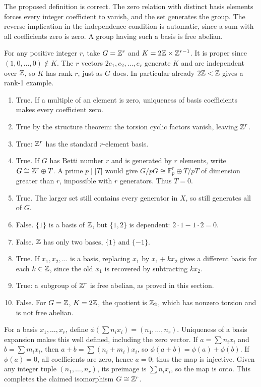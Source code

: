 The proposed definition is correct. The zero relation with distinct basis elements forces every integer coefficient to vanish, and the set generates the group. The reverse implication in the independence condition is automatic, since a sum with all coefficients zero is zero. A group having such a basis is free abelian.

For any positive integer $r$, take $G=\mathbb{Z}^r$ and $K=2\mathbb{Z}\times\mathbb{Z}^{r-1}$. It is proper since $(1,0,\ldots,0)\notin K$.
The $r$ vectors $2e_1,e_2,\ldots,e_r$ generate $K$ and are independent over $\mathbb{Z}$, so $K$ has rank $r$, just as $G$ does. In particular already $2\mathbb{Z}<\mathbb{Z}$ gives a rank-1 example.

\begin{enumerate}[label=\textbf{(\alph*)}]
\item True. If a multiple of an element is zero, uniqueness of basis coefficients makes every coefficient zero.
\item True by the structure theorem: the torsion cyclic factors vanish, leaving $\mathbb{Z}^r$.
\item True: $\mathbb{Z}^r$ has the standard $r$-element basis.
\item True. If $G$ has Betti number $r$ and is generated by $r$ elements, write $G\cong\mathbb{Z}^r\oplus T$. A prime $p\mid|T|$ would give $G/pG\cong\mathbb F_p^r\oplus T/pT$ of dimension greater than $r$, impossible with $r$ generators. Thus $T=0$.
\item True. The larger set still contains every generator in $X$, so still generates all of $G$.
\item False. $\{1\}$ is a basis of $\mathbb{Z}$, but $\{1,2\}$ is dependent: $2\cdot1-1\cdot2=0$.
\item False. $\mathbb{Z}$ has only two bases, $\{1\}$ and $\{-1\}$.
\item True. If $x_1,x_2,\ldots$ is a basis, replacing $x_1$ by $x_1+kx_2$ gives a different basis for each $k\in\mathbb{Z}$, since the old $x_1$ is recovered by subtracting $kx_2$.
\item True: a subgroup of $\mathbb{Z}^r$ is free abelian, as proved in this section.
\item False. For $G=\mathbb{Z}$, $K=2\mathbb{Z}$, the quotient is $\mathbb{Z}_2$, which has nonzero torsion and is not free abelian.
\end{enumerate}

For a basis $x_1,\ldots,x_r$, define $\phi(\sum n_ix_i)=(n_1,\ldots,n_r)$.
Uniqueness of a basis expansion makes this well defined, including the zero vector. If $a=\sum n_ix_i$ and $b=\sum m_ix_i$, then $a+b=\sum(n_i+m_i)x_i$, so $\phi(a+b)=\phi(a)+\phi(b)$.
If $\phi(a)=0$, all coefficients are zero, hence $a=0$; thus the map is injective. Given any integer tuple $(n_1,\ldots,n_r)$, its preimage is $\sum n_ix_i$, so the map is onto. This completes the claimed isomorphism $G\cong\mathbb{Z}^r$.

